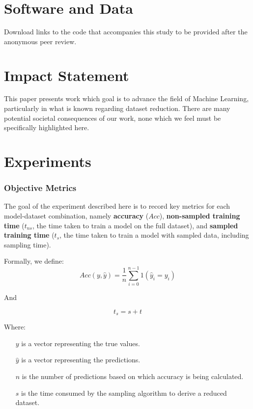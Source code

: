 \documentclass{article}
\theoremstyle{plain}
\theoremstyle{definition}
\theoremstyle{remark}
\begin{document}
\section*{Software and Data}

Download links to the code that accompanies this study to be provided after the anonymous peer review.

\section*{Impact Statement}

This paper presents work which goal is to advance the field of
Machine Learning, particularly in what is known regarding dataset reduction. There are many potential societal consequences
of our work, none which we feel must be specifically highlighted here.






\newpage
\appendix
\onecolumn
\section{Experiments}

\subsubsection{Objective Metrics}

The goal of the experiment described here is to record key metrics for each model-dataset combination, namely \textbf{accuracy} ($Acc$), \textbf{non-sampled training time} ($t_{ns}$, the time taken to train a model on the full dataset), and \textbf{sampled training time} ($t_s$,  the time taken to train a model with sampled data, including sampling time).

Formally, we define:
$$
Acc(y, \hat{y}) = \frac{1}{n} \sum_{i=0}^{n-1} 1(\hat{y}_i = y_i)
$$

And

$$
t_s = s + t
$$

Where:

\begin{itemize}

\item[$y$] is a vector representing the true values.
\item[$\hat{y}$] is a vector representing the predictions.
\item[$n$] is the number of predictions based on which accuracy is being calculated.
\item[$s$] is the time consumed by the sampling algorithm to derive a reduced dataset.

\end{itemize}
\end{document}
